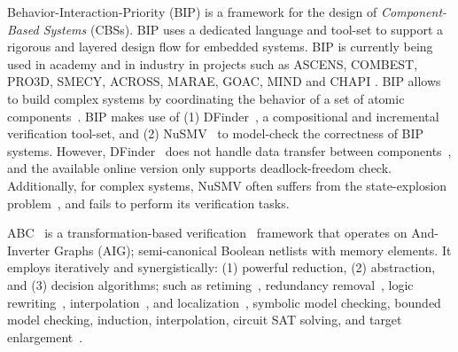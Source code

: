 %
Behavior-Interaction-Priority (BIP) is a framework for the design of 
{\em Component-Based Systems} (CBSs). 
BIP uses a dedicated language and tool-set to support a rigorous 
and layered design flow for embedded systems. 
BIP is currently being used in academy and in industry in projects such as 
ASCENS, COMBEST, PRO3D, SMECY, ACROSS, MARAE, GOAC, MIND and CHAPI \cite{bipwebsite}. 
BIP allows to build complex systems by coordinating the behavior of a set of 
atomic components~\cite{bip11}.
BIP makes use of (1) DFinder~\cite{dfinder}, a compositional  
and incremental verification tool-set, and (2) NuSMV~\cite{nusmv}
to model-check the correctness of BIP systems. 
However, DFinder~\cite{BBL14} does not handle data transfer between components~\cite{QiangB15}, 
and the available online version only supports deadlock-freedom check.
Additionally, for complex systems, NuSMV often suffers from the state-explosion problem~\cite{sipser2006introduction}, and fails to perform its verification tasks.

ABC~\cite{brayton2010abc} is a transformation-based 
verification~\cite{KuBa01} framework that operates on 
And-Inverter Graphs (AIG); semi-canonical Boolean netlists with
memory elements. It employs iteratively and synergistically: (1) powerful reduction, (2) abstraction, and (3) decision algorithms; such as
retiming~\cite{KuBa01}, 
redundancy removal~\cite{HmBPK05,KuMP01,BjesseC00,aziz-fmsd-00}, 
logic rewriting~\cite{BjBo04}, interpolation~\cite{McMillan03}, 
and localization~\cite{Wang03}, 
symbolic model checking, bounded model checking, induction, 
interpolation, circuit SAT solving, 
and target enlargement~\cite{MoGS00,MoMZ01,HoSH00,BaKuAb02,Hari05expert}.

